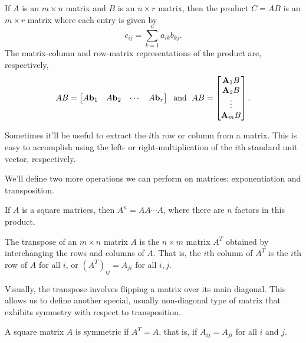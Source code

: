 \documentclass[../m073main.tex]{subfiles}
\begin{document}
\begin{definition}
	If $A$ is an $m\times n$ matrix and $B$ is an $n\times r$ matrix, then the product $C = AB$ is an $m\times r$ matrix where each entry is given by
	\[ c_{ij} = \sum_{k=1}^n a_{ik} b_{kj}. \]
	The matrix-column and row-matrix representations of the product are, respectively,
	\[ AB = \begin{bmatrix} A \mathbf{b}_1 & A \mathbf{b}_2 & \cdots & A \mathbf{b}_r \end{bmatrix} \;\text{ and }\; AB = \begin{bmatrix} \mathbf{A}_1 B \\ \mathbf{A}_2 B \\ \vdots \\ \mathbf{A}_m B \end{bmatrix}. \]
\end{definition}

Sometimes it'll be useful to extract the $i$th row or column from a matrix.
This is easy to accomplish using the left- or right-multiplication of the $i$th standard unit vector, respectively.

We'll define two more operations we can perform on matrices: exponentiation and transposition.

\begin{definition}
	If $A$ is a square matrices, then $A^n = AA\cdots A$, where there are $n$ factors in this product.

	The transpose of an $m\times n$ matrix $A$ is the $n\times m$ matrix $A^T$ obtained by interchanging the rows and columns of $A$.
	That is, the $i$th column of $A^T$ is the $i$th row of $A$ for all $i$, or $(A^T)_{ij} = A_{ji}$ for all $i, j$.
\end{definition}

Visually, the transpose involves flipping a matrix over its main diagonal.
This allows us to define another special, usually non-diagonal type of matrix that exhibits symmetry with respect to transposition.

\begin{definition}
	A square matrix $A$ is symmetric if $A^T = A$, that is, if $A_{ij} = A_{ji}$ for all $i$ and $j$.
\end{definition}

\end{document}
